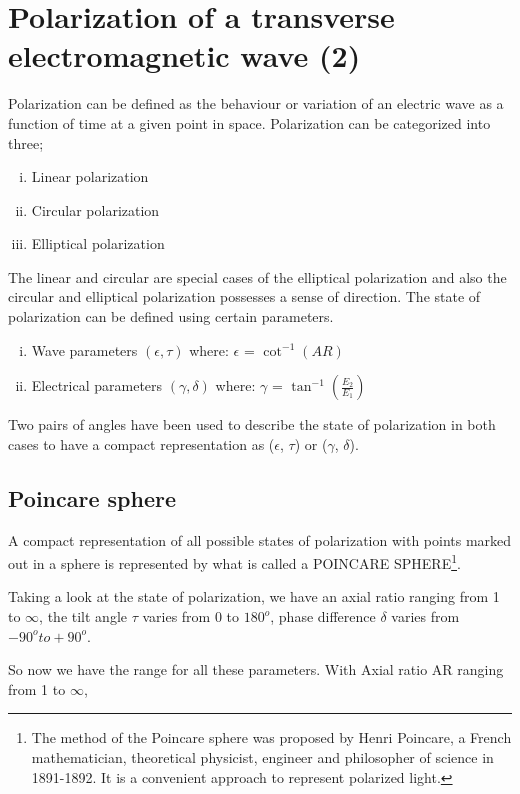 \chapter{Polarization of a transverse electromagnetic wave (2)}\label{lec:lec24}
Polarization can be defined as the behaviour or variation of an electric wave as a function of time at a given point in space. Polarization can be categorized into three; 
\begin{enumerate}[(i)]
\item Linear polarization
\item Circular polarization
\item Elliptical polarization
\end{enumerate}
The linear and circular are special cases of the elliptical polarization and also the circular and elliptical polarization possesses a sense of direction. The state of polarization can be defined using certain parameters.
\begin{enumerate}[(i)]
\item Wave parameters $(\epsilon,\tau)$
\newline where: $\epsilon$ = $\cot^{-1}(AR)$
\item Electrical parameters $(\gamma, \delta)$
\newline	where: $\gamma$ = $\tan^{-1} (\frac{E_{2}}{E_{1}})$
\end{enumerate}
Two pairs of angles have been used to describe the state of polarization in both cases to have a compact representation as ($\epsilon$, $\tau$)  or ($\gamma$, $\delta$).

\section{Poincare sphere}
A compact representation of all possible states of polarization with points marked out in a sphere is represented by what is called a POINCARE SPHERE\footnote{The method of the Poincare sphere was proposed by Henri Poincare, a French mathematician, theoretical physicist, engineer and philosopher of science in 1891-1892. It is a convenient approach to represent polarized light.}.

Taking a look at the state of polarization, we have an axial ratio ranging from 1 to $\infty$, the tilt angle $\tau$ varies from 0 to $180^{o}$, phase difference $\delta$ varies from $-90^{o} to +90^{o}$.

So now we have the range for all these parameters. With Axial ratio AR ranging from 1 to $\infty$, 

